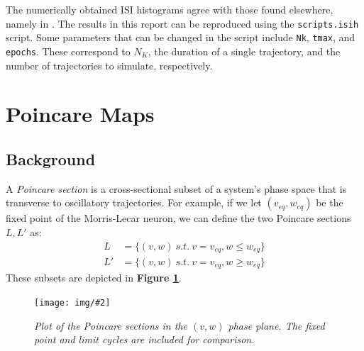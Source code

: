 \documentclass[letterpaper,12pt]{article}
\numberwithin{table}{section}
\numberwithin{figure}{section}
\numberwithin{equation}{section}
\newcommand{\centerfig}[2]{\begin{center}\texttt{[image: img/\#2]}\end{center}}
\newcommand{\ccaption}[1]{\caption{\textit{#1}}}
\newcommand{\reffig}[1]{\textbf{Figure \ref{#1}}}
\begin{document}
\begin{flushleft}
    The numerically obtained ISI histograms agree with those found elsewhere, namely in \cite{rowat}. The results in this report can be reproduced using the \texttt{scripts.isih} script. Some parameters that can be changed in the script include \texttt{Nk}, \texttt{tmax}, and \texttt{epochs}. These correspond to $N_K$, the duration of a single trajectory, and the number of trajectories to simulate, respectively.

    \pagebreak

    \section{Poincare Maps}
    
    \subsection{Background}

    A \textit{Poincare section} is a cross-sectional subset of a system's phase space that is transverse to oscillatory trajectories. For example, if we let $(v_{eq}, w_{eq})$ be the fixed point of the Morris-Lecar neuron, we can define the two Poincare sections $L, L'$ as:
    \begin{align}
        L &= \{(v, w) \: s.t. \: v = v_{eq}, w \leq w_{eq}\} \\
        L' &= \{(v, w) \: s.t. \: v = v_{eq}, w \geq w_{eq}\}
    \end{align}
    These subsets are depicted in \reffig{fig:pmap-def}.
    \begin{figure}[h]

        \centering
 
        \centerfig{0.9}{pmap-def.jpg}
    
        \captionsetup{width=0.75\linewidth}
        \ccaption{Plot of the Poincare sections in the $(v, w)$ phase plane. The fixed point and limit cycles are included for comparison.}
        \label{fig:pmap-def}
    
    \end{figure}


\end{flushleft}
\end{document}
